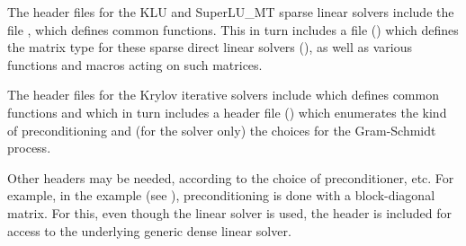 The header files for the KLU and SuperLU\_MT sparse linear solvers
include the file , which defines common functions.
This in turn includes a file () which defines
the matrix type for these sparse direct linear solvers (),
as well as various functions and macros acting on such matrices.

The header files for the Krylov iterative solvers include 
which defines common functions and which in turn includes a header file ()
which enumerates the kind of preconditioning and (for the {\spgmr} solver only) the choices for the Gram-Schmidt process.

Other headers may be needed, according to the choice of
preconditioner, etc.  For example, in the 
example (see \cite{ida_ex}), preconditioning is done with a
block-diagonal matrix. For this, even though the {\idaspgmr} linear
solver is used, the header  is included for
access to the underlying generic dense linear solver.

